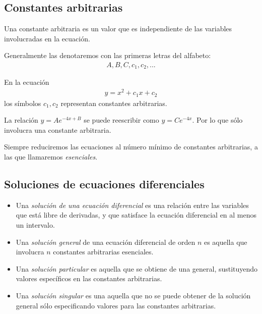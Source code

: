 \subsection{Constantes arbitrarias}

	Una constante arbitraria es un valor que es independiente de las variables involucradas en la ecuación.

	Generalmente las denotaremos con las primeras letras del alfabeto:
	\begin{align*}
		A,B,C,c_{1},c_{2},...
	\end{align*}


	\begin{ejemplo}
		En la ecuación
		\begin{align*}
		y = x^{2}+c_{1}x+c_{2}
		\end{align*}
		los símbolos $ c_{1}, c_{2} $ representan constantes arbitrarias.

	\end{ejemplo}


	\begin{ejemplo}
		La relación $ y = Ae^{-4x+B} $ se puede reescribir como $ y = Ce^{-4x} $.  Por lo que sólo involucra una constante arbitraria.
	\end{ejemplo}

\begin{observacion}

	Siempre reduciremos las ecuaciones al número mínimo de constantes arbitrarias, a las que llamaremos \emph{esenciales}.

\end{observacion}


\subsection{Soluciones de ecuaciones diferenciales}

\begin{itemize}
	\item 	Una \emph{solución de una ecuación diferencial} es una relación entre las variables que está libre de derivadas, y que satisface la ecuación diferencial en al menos un intervalo.
	\item
	Una \emph{solución general} de una ecuación diferencial de orden $ n $ es aquella que involucra $ n $ constantes arbitrarias esenciales.
	\item 	Una \emph{solución particular} es aquella que se obtiene de una general, sustituyendo valores específicos en las constantes arbitrarias.
	\item 	Una \emph{solución singular} es una aquella que no se puede obtener de la solución general sólo especificando valores para las constantes arbitrarias.
\end{itemize}

